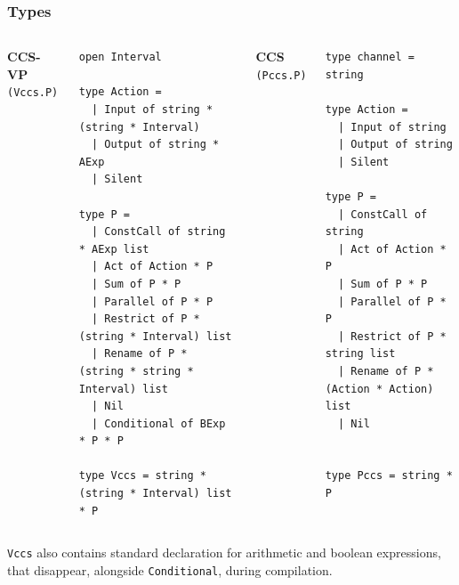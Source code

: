\documentclass[t]{beamer}
\begin{document}

\begin{frame}[fragile,c]
  \frametitle{Types}

  \begin{columns}[c]
    \centering
    \textbf{CCS-VP} \quad \texttt{(Vccs.P)}
    \begin{lstlisting}[basicstyle=\ttfamily\Tiny]
open Interval

type Action =
  | Input of string * (string * Interval) 
  | Output of string * AExp
  | Silent

type P =
  | ConstCall of string * AExp list 
  | Act of Action * P
  | Sum of P * P
  | Parallel of P * P
  | Restrict of P * (string * Interval) list
  | Rename of P * (string * string * Interval) list
  | Nil
  | Conditional of BExp * P * P

type Vccs = string * (string * Interval) list * P
    \end{lstlisting}

    \centering
    \textbf{CCS} \quad \texttt{(Pccs.P)}
    \begin{lstlisting}[basicstyle=\ttfamily\Tiny]
type channel = string

type Action =
  | Input of string
  | Output of string
  | Silent

type P =
  | ConstCall of string                
  | Act of Action * P                
  | Sum of P * P                   
  | Parallel of P * P               
  | Restrict of P * string list       
  | Rename of P * (Action * Action) list  
  | Nil


type Pccs = string * P
    \end{lstlisting}
  \end{columns}

  \vspace{1cm}
  \small
  \centering
  \texttt{Vccs} also contains standard declaration for arithmetic and boolean expressions, 
  that disappear, alongside \texttt{Conditional}, during compilation.

\end{frame}

\end{document}
